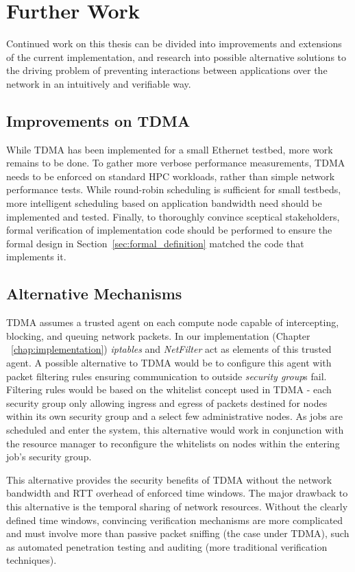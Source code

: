 \documentclass[oneside,12pt]{memoir}
\begin{document}
\section{Further Work}
Continued work on this thesis can be divided into improvements and extensions of the current implementation, and research into possible alternative solutions to the driving problem of preventing interactions between applications over the network in an intuitively and verifiable way.

\subsection{Improvements on TDMA}
While TDMA has been implemented for a small Ethernet testbed, more work remains to be done. To gather more verbose performance measurements, TDMA needs to be enforced on standard HPC workloads, rather than simple network performance tests. While round-robin scheduling is sufficient for small testbeds, more intelligent scheduling based on application bandwidth need should be implemented and tested. Finally, to thoroughly convince sceptical stakeholders, formal verification of implementation code should be performed to ensure the formal design in Section~\ref{sec:formal_definition} matched the code that implements it.

\subsection{Alternative Mechanisms}
TDMA assumes a trusted agent on each compute node capable of intercepting, blocking, and queuing network packets. In our implementation (Chapter ~\ref{chap:implementation}) \textit{iptables} and \textit{NetFilter} act as elements of this trusted agent. A possible alternative to TDMA would be to configure this agent with packet filtering rules ensuring communication to outside \textit{security group}s fail. Filtering rules would be based on the whitelist concept used in TDMA - each security group only allowing ingress and egress of packets destined for nodes within its own security group and a select few administrative nodes. As jobs are scheduled and enter the system, this alternative would work in conjunction with the resource manager to reconfigure the whitelists on nodes within the entering job's security group. 

This alternative provides the security benefits of TDMA without the network bandwidth and RTT overhead of enforced time windows. The major drawback to this alternative is the temporal sharing of network resources. Without the clearly defined time windows, convincing verification mechanisms are more complicated and must involve more than passive packet sniffing (the case under TDMA), such as automated penetration testing and auditing (more traditional verification techniques).
\appendix
\end{document}
